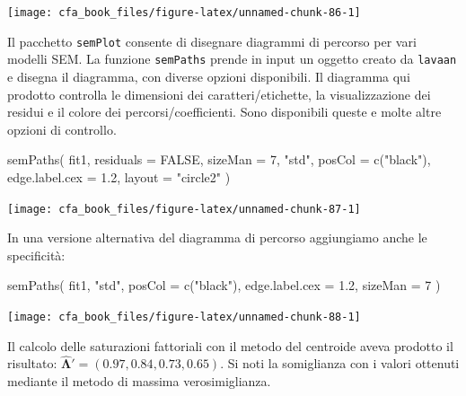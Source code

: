 \documentclass[
  11pt,
]{krantz}
\makeatletter
\newenvironment{Shaded}{\begin{snugshade}}{\end{snugshade}}
\newcommand{\AttributeTok}[1]{\textcolor[rgb]{0.61,0.61,0.61}{#1}}
\newcommand{\ConstantTok}[1]{\textcolor[rgb]{0,0,0}{#1}}
\newcommand{\DecValTok}[1]{\textcolor[rgb]{0.06,0.06,0.06}{#1}}
\newcommand{\FloatTok}[1]{\textcolor[rgb]{0.06,0.06,0.06}{#1}}
\newcommand{\FunctionTok}[1]{\textcolor[rgb]{0,0,0}{#1}}
\newcommand{\NormalTok}[1]{#1}
\newcommand{\StringTok}[1]{\textcolor[rgb]{0.5,0.5,0.5}{#1}}
\newenvironment{kframe}{%
\medskip{}
\setlength{\fboxsep}{.8em}
 \def\at@end@of@kframe{}%
 \ifinner\ifhmode%
  \def\at@end@of@kframe{\end{minipage}}%
  \begin{minipage}{\columnwidth}%
 \fi\fi%
 \def\FrameCommand##1{\hskip\@totalleftmargin \hskip-\fboxsep
 \colorbox{shadecolor}{##1}\hskip-\fboxsep
     \hskip-\linewidth \hskip-\@totalleftmargin \hskip\columnwidth}%
 \MakeFramed {\advance\hsize-\width
   \@totalleftmargin\z@ \linewidth\hsize
   \@setminipage}}%
 {\par\unskip\endMakeFramed%
 \at@end@of@kframe}
\renewenvironment{Shaded}{\begin{kframe}}{\end{kframe}}
\theoremstyle{definition}
\theoremstyle{definition}
\theoremstyle{definition}
\theoremstyle{definition}
\theoremstyle{remark}
\makeatother
\begin{document}
\begin{center}\texttt{[image: cfa\_book\_files/figure-latex/unnamed-chunk-86-1]} \end{center}

Il pacchetto \texttt{semPlot} consente di disegnare diagrammi di percorso per vari modelli SEM. La funzione \texttt{semPaths} prende in input un oggetto creato da \texttt{lavaan} e disegna il diagramma, con diverse opzioni disponibili. Il diagramma qui prodotto controlla le dimensioni dei caratteri/etichette, la visualizzazione dei residui e il colore dei percorsi/coefficienti. Sono disponibili queste e molte altre opzioni di controllo.

\begin{Shaded}
\begin{Highlighting}[]
\FunctionTok{semPaths}\NormalTok{(}
\NormalTok{  fit1,}
  \AttributeTok{residuals =} \ConstantTok{FALSE}\NormalTok{,}
  \AttributeTok{sizeMan =} \DecValTok{7}\NormalTok{,}
  \StringTok{"std"}\NormalTok{,}
  \AttributeTok{posCol =} \FunctionTok{c}\NormalTok{(}\StringTok{"black"}\NormalTok{),}
  \AttributeTok{edge.label.cex =} \FloatTok{1.2}\NormalTok{,}
  \AttributeTok{layout =} \StringTok{"circle2"}
\NormalTok{)}
\end{Highlighting}
\end{Shaded}

\begin{center}\texttt{[image: cfa\_book\_files/figure-latex/unnamed-chunk-87-1]} \end{center}

In una versione alternativa del diagramma di percorso aggiungiamo anche le specificità:

\begin{Shaded}
\begin{Highlighting}[]
\FunctionTok{semPaths}\NormalTok{(}
\NormalTok{  fit1,}
  \StringTok{"std"}\NormalTok{,}
  \AttributeTok{posCol =} \FunctionTok{c}\NormalTok{(}\StringTok{"black"}\NormalTok{),}
  \AttributeTok{edge.label.cex =} \FloatTok{1.2}\NormalTok{,}
  \AttributeTok{sizeMan =} \DecValTok{7}
\NormalTok{)}
\end{Highlighting}
\end{Shaded}

\begin{center}\texttt{[image: cfa\_book\_files/figure-latex/unnamed-chunk-88-1]} \end{center}

Il calcolo delle saturazioni fattoriali con il metodo del centroide aveva prodotto il risultato: \(\boldsymbol{\hat{\Lambda}}'= (0.97, 0.84, 0.73, 0.65)\). Si noti la somiglianza con i valori ottenuti mediante il metodo di massima verosimiglianza.
\end{document}
